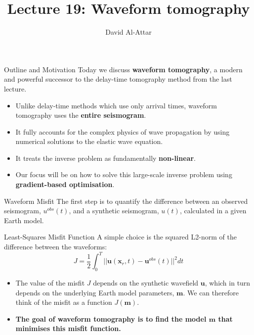 \documentclass{beamer}
\title[Lecture 19: Waveform tomography]{Lecture 19: Waveform tomography}
\author{David Al-Attar}
\institute{Michaelmas term 2024}
\date{}
\begin{document}

\begin{frame}
    \titlepage
\end{frame}

\begin{frame}{Outline and Motivation}
    Today we discuss \textbf{waveform tomography}, a modern and powerful successor to the delay-time tomography method from the last lecture.
    \begin{itemize}
        \item Unlike delay-time methods which use only arrival times, waveform tomography uses the \textbf{entire seismogram}.
        \pause
        \item It fully accounts for the complex physics of wave propagation by using numerical solutions to the elastic wave equation.
        \pause
        \item It treats the inverse problem as fundamentally \textbf{non-linear}.
        \pause
        \item Our focus will be on how to solve this large-scale inverse problem using \textbf{gradient-based optimisation}.
    \end{itemize}
\end{frame}


\begin{frame}{Waveform Misfit}
    The first step is to quantify the difference between an observed seismogram, $u^{obs}(t)$, and a synthetic seismogram, $u(t)$, calculated in a given Earth model.
    \pause
    \begin{block}{Least-Squares Misfit Function}
        A simple choice is the squared L2-norm of the difference between the waveforms:
        $$ J = \frac{1}{2}\int_{0}^{T} ||\mathbf{u}(\mathbf{x}_{r},t)-\mathbf{u}^{obs}(t)||^{2}dt $$
    \end{block}
    \pause
    \begin{itemize}
        \item The value of the misfit $J$ depends on the synthetic wavefield $\mathbf{u}$, which in turn depends on the underlying Earth model parameters, $\mathbf{m}$. We can therefore think of the misfit as a function $J(\mathbf{m})$.
        \pause
        \item \textbf{The goal of waveform tomography is to find the model $\mathbf{m}$ that minimises this misfit function.}
    \end{itemize}
\end{frame}
\end{document}

